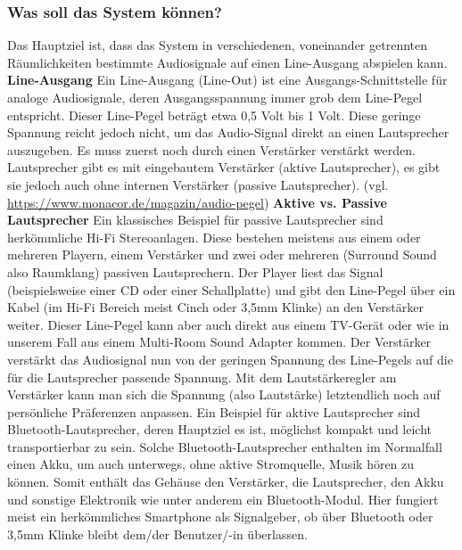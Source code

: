 \documentclass[11pt, twoside]{article}
\begin{document}
\subsubsection{Was soll das System können?}
Das Hauptziel ist, dass das System in verschiedenen, voneinander getrennten Räumlichkeiten bestimmte Audiosignale auf einen Line-Ausgang abspielen kann.
\vspace{4mm}\newline
\textbf{Line-Ausgang}\newline
Ein Line-Ausgang (Line-Out) ist eine Ausgangs-Schnittstelle für analoge Audiosignale, deren Ausgangsspannung immer grob dem Line-Pegel entspricht. Dieser \glqq Line-Pegel beträgt etwa 0,5 Volt bis 1 Volt\grqq{}. \newline
Diese geringe Spannung reicht jedoch nicht, um das Audio-Signal direkt an einen Lautsprecher auszugeben. Es muss zuerst noch durch einen Verstärker verstärkt werden. Lautsprecher gibt es mit eingebautem Verstärker (aktive Lautsprecher), es gibt sie jedoch auch ohne internen Verstärker (passive Lautsprecher).
\vspace{4mm}\newline
(vgl. \url{https://www.monacor.de/magazin/audio-pegel})
\vspace{4mm}\newline
\textbf{Aktive vs. Passive Lautsprecher}\newline
Ein klassisches Beispiel für passive Lautsprecher sind herkömmliche Hi-Fi Stereoanlagen. Diese bestehen meistens aus einem oder mehreren Playern, einem Verstärker und zwei oder mehreren (Surround Sound also Raumklang) passiven Lautsprechern. Der Player liest das Signal (beispielsweise einer CD oder einer Schallplatte) und gibt den Line-Pegel über ein Kabel (im Hi-Fi Bereich meist Cinch oder 3,5mm Klinke) an den Verstärker weiter. Dieser Line-Pegel kann aber auch direkt aus einem TV-Gerät oder wie in unserem Fall aus einem Multi-Room Sound Adapter kommen. Der Verstärker verstärkt das Audiosignal nun von der geringen Spannung des Line-Pegels auf die für die Lautsprecher passende Spannung. Mit dem Lautstärkeregler am Verstärker kann man sich die Spannung (also Lautstärke) letztendlich noch auf persönliche Präferenzen anpassen. \newline
Ein Beispiel für aktive Lautsprecher sind Bluetooth-Lautsprecher, deren Hauptziel es ist, möglichst kompakt und leicht transportierbar zu sein. Solche Bluetooth-Lautsprecher enthalten im Normalfall einen Akku, um auch unterwegs, ohne aktive Stromquelle, Musik hören zu können. Somit enthält das Gehäuse den Verstärker, die Lautsprecher, den Akku und sonstige Elektronik wie unter anderem ein Bluetooth-Modul. Hier fungiert meist ein herkömmliches Smartphone als Signalgeber, ob über Bluetooth oder 3,5mm Klinke bleibt dem/der Benutzer/-in überlassen.\newline
\end{document}
